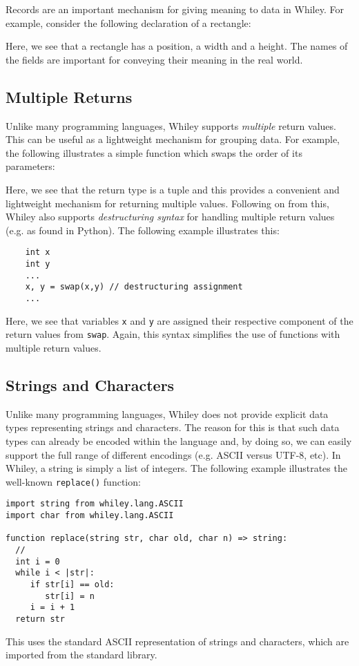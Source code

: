 Records are an important mechanism for giving meaning to data in Whiley.  For example, consider the following declaration of a rectangle:



Here, we see that a rectangle has a position, a width and a height.  The names of the fields are important for conveying their meaning in the real world.

\subsection{Multiple Returns}

Unlike many programming languages, Whiley supports {\em multiple} return values.  This can be useful as a lightweight mechanism for grouping data.  For example, the following illustrates a simple function which swaps the order of its parameters:



Here, we see that the return type is a tuple and this provides a convenient and lightweight mechanism for returning multiple values.  Following on from this, Whiley also supports {\em destructuring syntax} for handling multiple return values (e.g. as found in Python).  The following example illustrates this:

\begin{lstlisting}
    int x
    int y
    ...
    x, y = swap(x,y) // destructuring assignment
    ...        
\end{lstlisting}

Here, we see that variables \lstinline{x} and \lstinline{y} are assigned their respective component of the return values from \lstinline{swap}.  Again, this syntax simplifies the use of functions with multiple return values.

\subsection{Strings and Characters}

Unlike many programming languages, Whiley does not provide explicit data types representing strings and characters.  The reason for this is that such data types can already be encoded within the language and, by doing so, we can easily support the full range of different encodings (e.g. ASCII versus UTF-8, etc).  In Whiley, a string is simply a list of integers.  The following example illustrates the well-known \lstinline{replace()} function:

\begin{lstlisting}
import string from whiley.lang.ASCII
import char from whiley.lang.ASCII

function replace(string str, char old, char n) => string:
  //
  int i = 0
  while i < |str|:
     if str[i] == old:
        str[i] = n
     i = i + 1
  return str
\end{lstlisting}

This uses the standard ASCII representation of strings and characters, which are imported from the standard library.  
